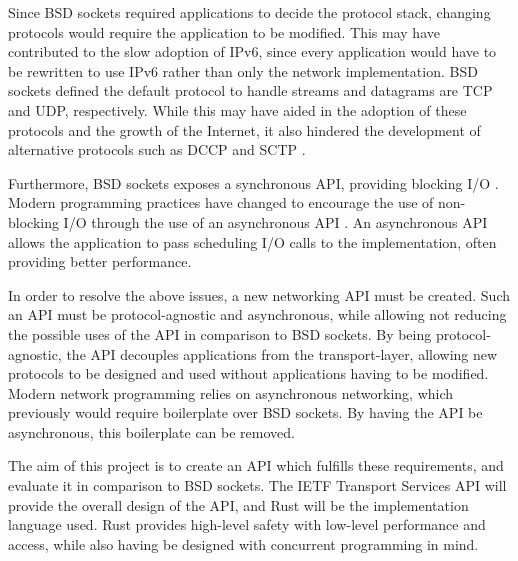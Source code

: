 \documentclass{l4proj}
\begin{document}
Since BSD sockets required applications to decide the protocol stack, changing protocols would require the application
to be modified.
This may have contributed to the slow adoption of IPv6, since every application would have to be rewritten to use IPv6
rather than only the network implementation.
BSD sockets defined the default protocol to handle streams and datagrams are TCP and UDP, respectively.
While this may have aided in the adoption of these protocols and the growth of the Internet, it also hindered the
development of alternative protocols such as DCCP and SCTP .

Furthermore, BSD sockets exposes a synchronous API, providing blocking I/O .
Modern programming practices have changed to encourage the use of non-blocking I/O through the use of an asynchronous
API .
An asynchronous API allows the application to pass scheduling I/O calls to the implementation, often providing better
performance.

In order to resolve the above issues, a new networking API must be created.
Such an API must be protocol-agnostic and asynchronous, while allowing not reducing the possible uses of the API in
comparison to BSD sockets.
By being protocol-agnostic, the API decouples applications from the transport-layer, allowing new protocols to be
designed and used without applications having to be modified.
Modern network programming relies on asynchronous networking, which previously would require boilerplate over BSD
sockets.
By having the API be asynchronous, this boilerplate can be removed.

The aim of this project is to create an API which fulfills these requirements, and evaluate it in comparison to BSD
sockets.
The IETF Transport Services API will provide the overall design of the API, and Rust will be the implementation language
used.
Rust provides high-level safety with low-level performance and access, while also having be designed with concurrent
programming in mind.
\end{document}

